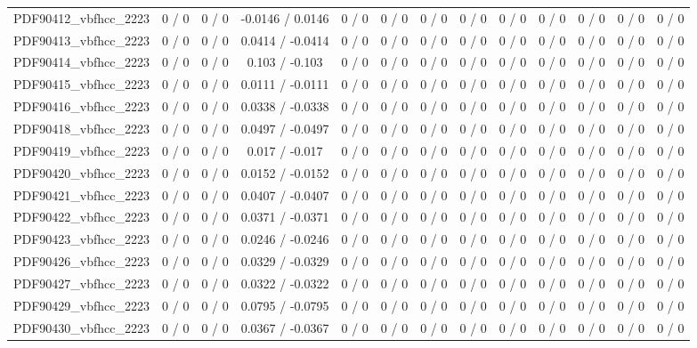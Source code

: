 \documentclass[10pt]{article}
\begin{document}
\begin{table}[htbp]
\begin{center}
\begin{tabular}{|c|c|c|c|c|c|c|c|c|c|c|c|c|}
  PDF90412_vbfhcc_2223 & 0 / 0 & 0 / 0 & -0.0146 / 0.0146 & 0 / 0 & 0 / 0 & 0 / 0 & 0 / 0 & 0 / 0 & 0 / 0 & 0 / 0 & 0 / 0 & 0 / 0 \\ 
  PDF90413_vbfhcc_2223 & 0 / 0 & 0 / 0 & 0.0414 / -0.0414 & 0 / 0 & 0 / 0 & 0 / 0 & 0 / 0 & 0 / 0 & 0 / 0 & 0 / 0 & 0 / 0 & 0 / 0 \\ 
  PDF90414_vbfhcc_2223 & 0 / 0 & 0 / 0 & 0.103 / -0.103 & 0 / 0 & 0 / 0 & 0 / 0 & 0 / 0 & 0 / 0 & 0 / 0 & 0 / 0 & 0 / 0 & 0 / 0 \\ 
  PDF90415_vbfhcc_2223 & 0 / 0 & 0 / 0 & 0.0111 / -0.0111 & 0 / 0 & 0 / 0 & 0 / 0 & 0 / 0 & 0 / 0 & 0 / 0 & 0 / 0 & 0 / 0 & 0 / 0 \\ 
  PDF90416_vbfhcc_2223 & 0 / 0 & 0 / 0 & 0.0338 / -0.0338 & 0 / 0 & 0 / 0 & 0 / 0 & 0 / 0 & 0 / 0 & 0 / 0 & 0 / 0 & 0 / 0 & 0 / 0 \\ 
  PDF90418_vbfhcc_2223 & 0 / 0 & 0 / 0 & 0.0497 / -0.0497 & 0 / 0 & 0 / 0 & 0 / 0 & 0 / 0 & 0 / 0 & 0 / 0 & 0 / 0 & 0 / 0 & 0 / 0 \\ 
  PDF90419_vbfhcc_2223 & 0 / 0 & 0 / 0 & 0.017 / -0.017 & 0 / 0 & 0 / 0 & 0 / 0 & 0 / 0 & 0 / 0 & 0 / 0 & 0 / 0 & 0 / 0 & 0 / 0 \\ 
  PDF90420_vbfhcc_2223 & 0 / 0 & 0 / 0 & 0.0152 / -0.0152 & 0 / 0 & 0 / 0 & 0 / 0 & 0 / 0 & 0 / 0 & 0 / 0 & 0 / 0 & 0 / 0 & 0 / 0 \\ 
  PDF90421_vbfhcc_2223 & 0 / 0 & 0 / 0 & 0.0407 / -0.0407 & 0 / 0 & 0 / 0 & 0 / 0 & 0 / 0 & 0 / 0 & 0 / 0 & 0 / 0 & 0 / 0 & 0 / 0 \\ 
  PDF90422_vbfhcc_2223 & 0 / 0 & 0 / 0 & 0.0371 / -0.0371 & 0 / 0 & 0 / 0 & 0 / 0 & 0 / 0 & 0 / 0 & 0 / 0 & 0 / 0 & 0 / 0 & 0 / 0 \\ 
  PDF90423_vbfhcc_2223 & 0 / 0 & 0 / 0 & 0.0246 / -0.0246 & 0 / 0 & 0 / 0 & 0 / 0 & 0 / 0 & 0 / 0 & 0 / 0 & 0 / 0 & 0 / 0 & 0 / 0 \\ 
  PDF90426_vbfhcc_2223 & 0 / 0 & 0 / 0 & 0.0329 / -0.0329 & 0 / 0 & 0 / 0 & 0 / 0 & 0 / 0 & 0 / 0 & 0 / 0 & 0 / 0 & 0 / 0 & 0 / 0 \\ 
  PDF90427_vbfhcc_2223 & 0 / 0 & 0 / 0 & 0.0322 / -0.0322 & 0 / 0 & 0 / 0 & 0 / 0 & 0 / 0 & 0 / 0 & 0 / 0 & 0 / 0 & 0 / 0 & 0 / 0 \\ 
  PDF90429_vbfhcc_2223 & 0 / 0 & 0 / 0 & 0.0795 / -0.0795 & 0 / 0 & 0 / 0 & 0 / 0 & 0 / 0 & 0 / 0 & 0 / 0 & 0 / 0 & 0 / 0 & 0 / 0 \\ 
  PDF90430_vbfhcc_2223 & 0 / 0 & 0 / 0 & 0.0367 / -0.0367 & 0 / 0 & 0 / 0 & 0 / 0 & 0 / 0 & 0 / 0 & 0 / 0 & 0 / 0 & 0 / 0 & 0 / 0 \\ 

\end{tabular}
\end{center}
\end{table}
\end{document}
